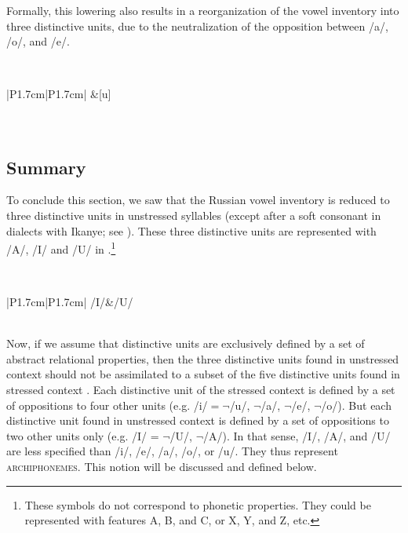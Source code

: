 \documentclass[output=paper,
modfonts,
newtxmath,
hidelinks,
]{langscibook}
\begin{document}
\noindent Formally, this lowering also results in a reorganization of the vowel inventory into three distinctive units, due to the neutralization of the opposition between /a/, /o/, and /e/.

\label{5:16}\\\medskip
\begin{tabular}{|P{1.7cm}|P{1.7cm}|}
\hline
[i]&[u]\\\hline
{}\\
\\\hline
\end{tabular}
\z


\subsection{Summary}\label{5:s2.4}

To conclude this section, we saw that the Russian vowel inventory is reduced to three distinctive units in unstressed syllables (except after a soft consonant in dialects with Ikanye; see ). These three distinctive units are represented with /A/, /I/ and /U/ in .\footnote{These symbols do not correspond to phonetic properties. They could be represented with features {\textbar}A{\textbar}, {\textbar}B{\textbar}, and {\textbar}C{\textbar}, or {\textbar}X{\textbar}, {\textbar}Y{\textbar}, and {\textbar}Z{\textbar}, etc.}

\label{5:17}\\\medskip
\begin{tabular}{|P{1.7cm}|P{1.7cm}|}
\hline
/I/&/U/\\\hline
{}\\\hline
\end{tabular}
\z

\noindent Now, if we assume that distinctive units are exclusively defined by a set of abstract relational properties, then the three distinctive units found in unstressed context  should not be assimilated to a subset of the five distinctive units found in stressed context . Each distinctive unit of the stressed context is defined by a set of oppositions to four other units (e.g. /i/${}=\neg{}$/u/, $\neg$/a/, $\neg$/e/, $\neg$/o/). But each distinctive unit found in unstressed context  is defined by a set of oppositions to two other units only (e.g. /I/ = $\neg$/U/, $\neg$/A/). In that sense, /I/, /A/, and /U/ are less specified than /i/, /e/, /a/, /o/, or /u/. They thus represent \textsc{archiphonemes}. This notion will be discussed and defined below.
\end{document}
